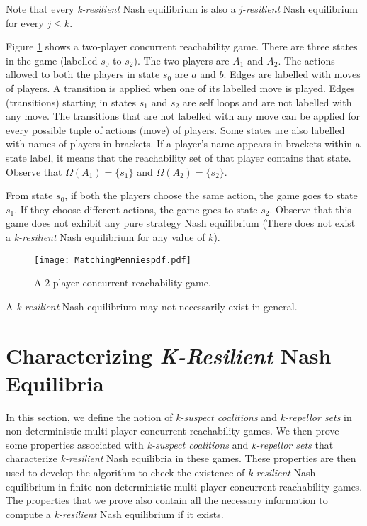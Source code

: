 \begin{remark}
Note that every \textit{k-resilient} Nash equilibrium is also a \textit{j-resilient} Nash equilibrium for every $j \leq k$.
\end{remark}

\begin{example}
Figure \ref{fig:matchingpennies} shows a two-player concurrent reachability game. There are three states in the game (labelled $s_{0}$ to $s_{2}$). The two players are $A_{1}$ and $A_{2}$. The actions allowed to both the players in state $s_{0}$ are $a$ and $b$. Edges are labelled with moves of players. A transition is applied when one of its labelled move is played. Edges (transitions) starting in states $s_{1}$ and $s_{2}$ are self loops and are not labelled with any move. The transitions that are not labelled with any move can be applied for every possible tuple of actions (move) of players. Some states are also labelled with names of players in brackets. If a player's name appears in brackets within a state label, it means that the reachability set of that player contains that state. Observe that $\Omega(A_{1}) = \lbrace s_{1} \rbrace$ and $\Omega(A_{2}) = \lbrace s_{2} \rbrace$.

From state $s_{0}$, if both the players choose the same action, the game goes to state $s_{1}$. If they choose different actions, the game goes to state $s_{2}$. Observe that this game does not exhibit any pure strategy Nash equilibrium (There does not exist a \textit{k-resilient} Nash equilibrium for any value of $k$).
\end{example}

\begin{figure}[H]
	\centering
	\texttt{[image: MatchingPenniespdf.pdf]}
	\caption{A 2-player concurrent reachability game.}
	\label{fig:matchingpennies}
\end{figure}

\begin{remark}
A \textit{k-resilient} Nash equilibrium may not necessarily exist in general.
\end{remark}

\section{Characterizing \textit{K-Resilient} Nash Equilibria}

In this section, we define the notion of \textit{k-suspect coalitions} and \textit{k-repellor sets} in non-deterministic multi-player concurrent reachability games. We then prove some properties associated with \textit{k-suspect coalitions} and \textit{k-repellor sets} that characterize \textit{k-resilient} Nash equilibria in these games. These properties are then used to develop the algorithm to check the existence of \textit{k-resilient} Nash equilibrium in finite non-deterministic multi-player concurrent reachability games. The properties that we prove also contain all the necessary information to compute a \textit{k-resilient} Nash equilibrium if it exists.

